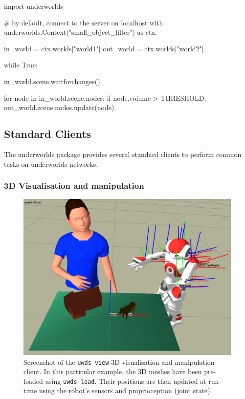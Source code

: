 \documentclass[letterpaper, 10pt, conference]{ieeeconf}
\newcommand{\uwds}{{\sc underworlds}\xspace}
\begin{document}
\begin{listing}[h!]

\begin{pythoncode}
import underworlds

# by default, connect to the server on localhost
with underworlds.Context("small_object_filter") as ctx:

    in_world = ctx.worlds["world1"]
    out_world = ctx.worlds["world2"]

    while True:

        in_world.scene.waitforchanges()

        for node in in_world.scene.nodes:
            if node.volume > THRESHOLD:
                out_world.scene.nodes.update(node)


\end{pythoncode}
    \caption{Example of a simple yet complete \uwds filter, written in Python:
    the client connects to the \uwds network, blocks until the world {\tt
    world1} changes, and only propagate nodes that match the condition to
    the world {\tt world2}.}

    \label{lst|pythonapi}
\end{listing}

\subsection{Standard Clients}
\label{std_clients}

The \uwds package provides several standard clients to perform common tasks on
\uwds networks.

\subsubsection{3D Visualisation and manipulation}

\begin{figure}
    \centering
    \includegraphics[width=\linewidth]{uwds-screenshot}
    \caption{Screenshot of the {\tt uwds view} 3D visualisation and manipulation
    client. In this particular example, the 3D meshes have been pre-loaded using
    {\tt uwds load}. Their positions are then updated at run-time using the
    robot's sensors and proprioception (joint state).}
    \label{fig|uwds-view}
\end{figure}
\end{document}
